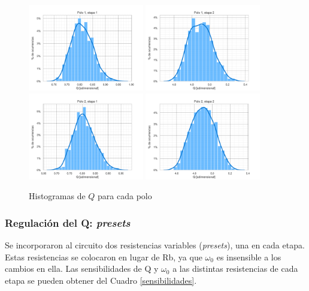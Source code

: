 \documentclass[spanish]{article}
\begin{document}
\begin{figure}[H]
    \centering
    \includegraphics[width=0.45\textwidth]{Resources/histograma_q_poles_00.png}
    \includegraphics[width=0.45\textwidth]{Resources/histograma_q_poles_01.png}
    \includegraphics[width=0.45\textwidth]{Resources/histograma_q_poles_10.png}
    \includegraphics[width=0.45\textwidth]{Resources/histograma_q_poles_11.png}
    \caption{Histogramas de $Q$ para cada polo}
    \label{sedrahistq}
\end{figure}


\subsubsection{Regulación del Q: \emph{presets}}
Se incorporaron al circuito dos resistencias variables (\emph{presets}), una en cada etapa. Estas resistencias se colocaron en lugar de Rb, ya que $\omega_{0}$ es insensible a los cambios en ella. Las sensibilidades de Q y $\omega_{0}$ a las distintas resistencias de cada etapa se pueden obtener del Cuadro \ref{sensibilidades}.
\end{document}
